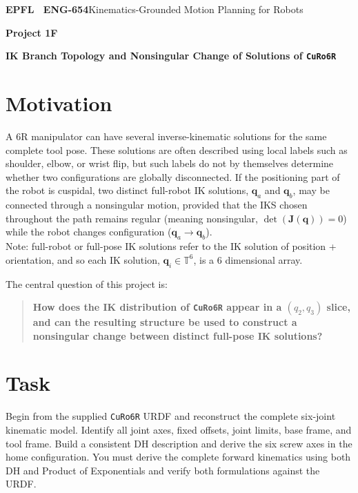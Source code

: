 \documentclass[11pt,a4paper]{article}
\begin{document}
{\small\textbf{EPFL \textbar\ ENG-654}\hfill Kinematics-Grounded Motion Planning for Robots}
\vspace{5mm}

{\color{epflred}\Large\bfseries Project 1F}

{\LARGE\bfseries IK Branch Topology and Nonsingular Change of Solutions of \texttt{CuRo6R}\par}

\section*{Motivation}
A 6R manipulator can have several inverse-kinematic solutions for the same complete tool pose. These solutions are often described using local labels such as shoulder, elbow, or wrist flip, but such labels do not by themselves determine whether two configurations are globally disconnected. If the positioning part of the robot is cuspidal, two distinct full-robot IK solutions, $\mathbf q_a$ and $\mathbf q_b$, may be connected through a nonsingular motion, provided that the IKS chosen throughout the path remains regular (meaning nonsingular, $\det(\mathbf J(\mathbf q)) = 0$) while the robot changes configuration ($\mathbf q_a \rightarrow \mathbf q_b$). \\
Note: full-robot or full-pose IK solutions refer to the IK solution of position + orientation, and so each IK solution, $\mathbf q_i \in \mathbb T^6$, is a 6 dimensional array. 

The central question of this project is:

\begin{quote}
\textbf{How does the IK distribution of \texttt{CuRo6R} appear in a $(q_2,q_3)$ slice, and can the resulting structure be used to construct a nonsingular change between distinct full-pose IK solutions?}
\end{quote}

\section*{Task}
Begin from the supplied \texttt{CuRo6R} URDF and reconstruct the complete six-joint kinematic model. Identify all joint axes, fixed offsets, joint limits, base frame, and tool frame. Build a consistent DH description and derive the six screw axes in the home configuration. You must derive the complete forward kinematics using both DH and Product of Exponentials and verify both formulations against the URDF.
\end{document}
